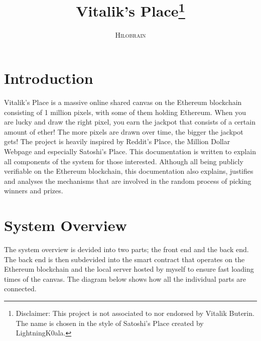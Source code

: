\documentclass[a4paper]{article}
\title{\vspace{-15mm}\fontsize{24pt}{10pt}\selectfont\textbf{Vitalik's Place\footnote{Disclaimer: This project is not associated to nor endorsed by Vitalik Buterin. The name is chosen in the style of Satoshi's Place created by LightningK0ala.}}}
\author{
\large
{\textsc{Hilobrain}}}
\begin{document}
\maketitle{}

\setcounter{tocdepth}{2}
\tableofcontents%

\newppage%

\section{Introduction}
Vitalik's Place is a massive online shared canvas on the Ethereum blockchain consisting of 1 million pixels, with some of them holding Ethereum. When you are lucky and draw the right pixel, you earn the jackpot that consists of a certain amount of ether! The more pixels are drawn over time, the bigger the jackpot gets! The project is heavily inspired by Reddit's Place, the Million Dollar Webpage and especially Satoshi's Place. This documentation is written to explain all components of the system for those interested. Although all being publicly verifiable on the Ethereum blockchain, this documentation also explains, justifies and analyses the mechanisms that are involved in the random process of picking winners and prizes.

\section{System Overview}
The system overview is devided into two parts; the front end and the back end. The back end is then subdevided into the smart contract that operates on the Ethereum blockchain and the local server hosted by myself to ensure fast loading times of the canvas. The diagram below shows how all the individual parts are connected.
\end{document}
